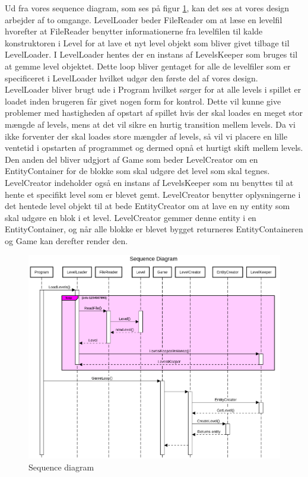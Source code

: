 Ud fra vores sequence diagram, som ses på figur \ref{seqDig}, kan det ses at vores design arbejder af to omgange. LevelLoader beder FileReader om at læse en levelfil hvorefter at FileReader benytter informationerne fra levelfilen til kalde konstruktoren i Level for at lave et nyt level objekt som bliver givet tilbage til LevelLoader. I LevelLoader hentes der en instans af LevelsKeeper som bruges til at gemme level objektet. Dette loop bliver gentaget for alle de levelfiler som er specificeret i LevelLoader hvilket udgør den første del af vores design. LevelLoader bliver brugt ude i Program hvilket sørger for at alle levels i spillet er loadet inden brugeren får givet nogen form for kontrol. Dette vil kunne give problemer med hastigheden af opstart af spillet hvis der skal loades en meget stor mængde af levels, mens at det vil sikre en hurtig transition mellem levels. Da vi ikke forventer der skal loades store mængder af levels, så vil vi placere en lille ventetid i opstarten af programmet og dermed opnå et hurtigt skift mellem levels. \\
Den anden del bliver udgjort af Game som beder LevelCreator om en EntityContainer for de blokke som skal udgøre det level som skal tegnes. LevelCreator indeholder også en instans af LevelsKeeper som nu benyttes til at hente et specifikt level som er blevet gemt. LevelCreator benytter oplysningerne i det hentede level objekt til at bede EntityCreator om at lave en ny entity som skal udgøre en blok i et level. LevelCreator gemmer denne entity i en EntityContainer, og når alle blokke er blevet bygget returneres EntityContaineren og Game kan derefter render den.\\
\begin{figure}
  \includegraphics[width=\linewidth]{latex/Images/SequenceDiagram.png}
  \caption{Sequence diagram}
  \label{seqDig}
\end{figure}
